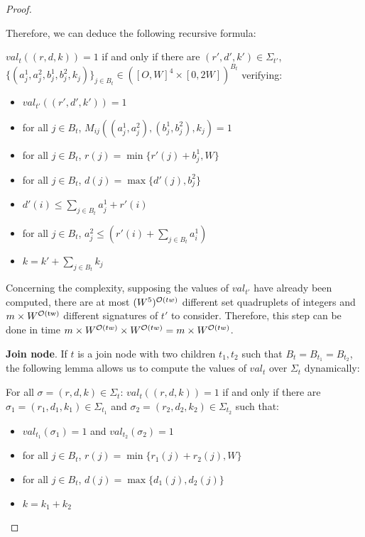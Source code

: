 \begin{proof}
\begin{nestedproof}
    Therefore, we can deduce the following recursive formula:

    $val_t((r,d,k))=1$ if and only if there are $(r',d',k')\in \Sigma_{t'}$, $\{(a_j^1,a_j^2,b_j^1,b_j^2,k_j)\}_{j\in B_t}\in ([O,W]^4\times[0,2W])^{B_t}$  verifying: \begin{itemize}
        \item $val_{t'}((r',d',k'))=1$
        \item for all $j\in B_t$, $M_{ij}((a_j^1,a_j^2),(b_j^1,b_j^2),k_j)=1$
        \item for all $j\in B_t$, $r(j)=\min\{r'(j)+b_j^1,W\}$
        \item for all $j\in B_t$, $d(j)=\max\{d'(j),b_j^2\}$
        \item $d'(i)\leq\sum_{j\in B_t}a_j^1+r'(i)$
        \item for all $j\in B_t$, $a_j^2\leq(r'(i)+\sum_{j\in B_t}a_i^1)$
        \item $k=k'+\sum_{j\in B_t}k_j$
    \end{itemize}

    \end{nestedproof}

    Concerning the complexity, supposing the values of $val_{t'}$ have already been computed, there are at most $(W^5)^{\mathcal{O}(tw)}$ different set quadruplets of integers and $m\times W^{\mathcal{O}(\mathrm{tw})}$ different signatures of $t'$ to consider. Therefore, this step can be done in time $m\times W^{\mathcal{O}(tw)}\times W^{\mathcal{O}(tw)}=m\times W^{\mathcal{O}(tw)}$.
    \medskip

    \textbf{Join node}. If $t$ is a join node with two children $t_1,t_2$ such that $B_t=B_{t_1}=B_{t_2}$, the following lemma allows us to compute the values of $val_t$ over $\Sigma_t$ dynamically:

    \begin{lemma}
    For all $\sigma=(r,d,k)\in\Sigma_t$:
    $val_t((r,d,k))=1$ if and only if there are
     $\sigma_1=(r_1,d_1,k_1)\in \Sigma_{t_1}$ and $\sigma_2=(r_2,d_2,k_2)\in \Sigma_{t_2}$ such that:
    \begin{itemize}
        \item $val_{t_1}(\sigma_1)=1$ and $val_{t_2}(\sigma_2)=1$
        \item for all $j\in B_t$, $r(j)=\min\{r_1(j)+r_2(j),W\}$
        \item for all $j\in B_t$, $d(j)=\max\{d_1(j),d_2(j)\}$
        \item $k=k_1+k_2$
    \end{itemize}


\end{lemma}
\end{proof}
